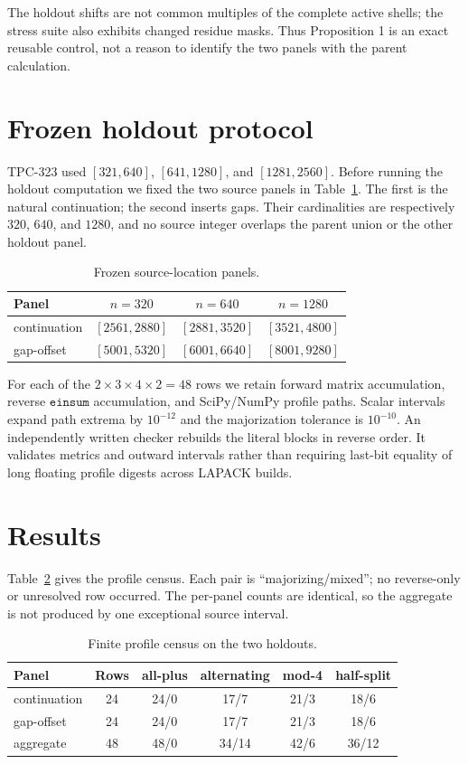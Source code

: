 \documentclass[10pt]{article}
\begin{document}
The holdout shifts are not common multiples of the complete active shells;
the stress suite also exhibits changed residue masks.  Thus Proposition 1 is
an exact reusable control, not a reason to identify the two panels with the
parent calculation.

\section{Frozen holdout protocol}

TPC-323 used $[321,640]$, $[641,1280]$, and $[1281,2560]$.  Before running
the holdout computation we fixed the two source panels in Table~\ref{tab:panels}.
The first is the natural continuation; the second inserts gaps.  Their
cardinalities are respectively $320$, $640$, and $1280$, and no source
integer overlaps the parent union or the other holdout panel.

\begin{table}[t]
\centering
\caption{Frozen source-location panels.}
\label{tab:panels}
\begin{tabular}{@{}lccc@{}}
\toprule
Panel & $n=320$ & $n=640$ & $n=1280$\\
\midrule
continuation & $[2561,2880]$ & $[2881,3520]$ & $[3521,4800]$\\
gap-offset & $[5001,5320]$ & $[6001,6640]$ & $[8001,9280]$\\
\bottomrule
\end{tabular}
\end{table}

For each of the $2\times3\times4\times2=48$ rows we retain forward matrix
accumulation, reverse $\texttt{einsum}$ accumulation, and SciPy/NumPy
profile paths.  Scalar intervals expand path extrema by $10^{-12}$ and the
majorization tolerance is $10^{-10}$.  An independently written checker
rebuilds the literal blocks in reverse order.  It validates metrics and
outward intervals rather than requiring last-bit equality of long floating
profile digests across LAPACK builds.

\section{Results}

Table~\ref{tab:census} gives the profile census.  Each pair is
``majorizing/mixed''; no reverse-only or unresolved row occurred.  The
per-panel counts are identical, so the aggregate is not produced by one
exceptional source interval.

\begin{table}[t]
\centering
\caption{Finite profile census on the two holdouts.}
\label{tab:census}
\begin{tabular}{@{}lccccc@{}}
\toprule
Panel & Rows & all-plus & alternating & mod-4 & half-split\\
\midrule
continuation & 24 & 24/0 & 17/7 & 21/3 & 18/6\\
gap-offset & 24 & 24/0 & 17/7 & 21/3 & 18/6\\
\midrule
aggregate & 48 & 48/0 & 34/14 & 42/6 & 36/12\\
\bottomrule
\end{tabular}
\end{table}
\end{document}
